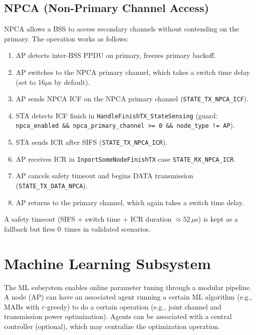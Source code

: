 \documentclass[11pt,a4paper]{article}
\begin{document}
\subsection{NPCA (Non-Primary Channel Access)}

NPCA allows a BSS to access secondary channels without contending on the primary. The operation works as follows:

\begin{enumerate}[nosep]
  \item AP detects inter-BSS PPDU on primary, freezes primary backoff.
  \item AP switches to the NPCA primary channel, which takes a switch time delay (set to 16$\mu$s by default). 
  \item AP sends NPCA ICF on the NPCA primary channel (\texttt{STATE\_TX\_NPCA\_ICF}).
  \item STA detects ICF finish in \texttt{HandleFinishTX\_StateSensing} (guard: \texttt{npca\_enabled \&\& npca\_primary\_channel >= 0 \&\& node\_type != AP}).
  \item STA sends ICR after SIFS (\texttt{STATE\_TX\_NPCA\_ICR}).
  \item AP receives ICR in \texttt{InportSomeNodeFinishTX} case \texttt{STATE\_RX\_NPCA\_ICR}.
  \item AP cancels safety timeout and begins DATA transmission (\texttt{STATE\_TX\_DATA\_NPCA}).
  \item AP returns to the primary channel, which again takes a switch time delay.
\end{enumerate}

A safety timeout (SIFS + switch time + ICR duration $\approx 52\,\mu$s) is kept as a fallback but fires 0~times in validated scenarios.

\section{Machine Learning Subsystem}
\label{sec:ml}

The ML subsystem enables online parameter tuning through a modular pipeline. A node (AP) can have an associated agent running a certain ML algorithm (e.g., MABs with $\varepsilon$-greedy) to do a certain operation (e.g., joint channel and transmission power optimization). Agents can be associated with a central controller (optional), which may centralize the optimization operation.
\end{document}
